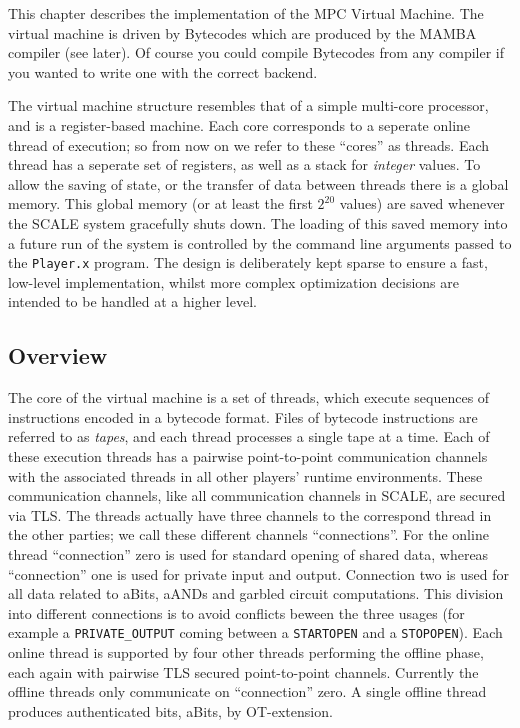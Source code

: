 
\label{ch:vm}

This chapter describes the implementation of the
MPC Virtual Machine. 
The virtual machine is driven by Bytecodes which
are produced by the MAMBA compiler (see later).
Of course you could compile Bytecodes from any compiler
if you wanted to write one with the correct backend.

The virtual machine structure resembles that of a
simple multi-core processor, and is a register-based
machine.
Each core corresponds to a seperate online thread
of execution; so from now on we refer to these ``cores''
as threads.
Each thread has a seperate set of registers, as
well as a stack for {\em integer} values.
To allow the saving of state, or the transfer of data
between threads there is a global memory.
This global memory (or at least the first $2^{20}$
values) are saved whenever the SCALE system gracefully
shuts down.
The loading of this saved memory into a future run of the
system is controlled by the command line arguments
passed to the \verb+Player.x+ program.
The design is deliberately kept sparse to ensure a fast, low-level 
implementation, whilst more complex optimization decisions are intended 
to be handled at a higher level.

\subsection{Overview}

The core of the virtual machine is a set of threads, which
execute sequences of instructions encoded in a bytecode format.
Files of bytecode instructions are referred to as \emph{tapes},
and each thread processes a single tape at a time.
Each of these execution threads has a pairwise point-to-point
communication channels with the associated threads in all
other players' runtime environments.
These communication channels, like all communication channels
in SCALE, are secured via TLS.
The threads actually have three channels to the correspond
thread in the other parties; we call these different channels
``connections''.
For the online thread ``connection'' zero is used for standard
opening of shared data, whereas ``connection'' one is used for
private input and output.
Connection two is used for all data related to aBits, aANDs
and garbled circuit computations.
This division into different connections is to avoid conflicts beween
the three usages (for example a \verb+PRIVATE_OUTPUT+ coming between
a \verb+STARTOPEN+ and a \verb+STOPOPEN+).
Each online thread is supported by four other threads
performing the offline phase, each again with pairwise 
TLS secured point-to-point channels. Currently the offline
threads only communicate on ``connection'' zero.
A single offline thread produces authenticated bits, aBits,
by OT-extension.

